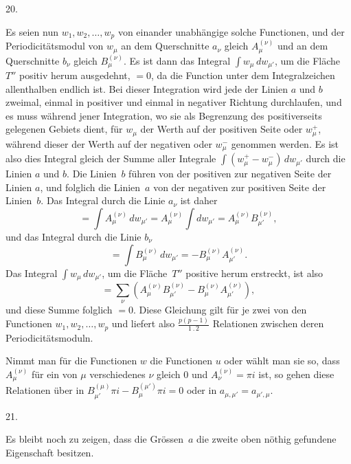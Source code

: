 \documentclass[a4paper,12pt,leqno]{article}
\begin{document}
\medbreak

\centerline{20.}

\nobreak\medskip

Es seien nun $w_1, w_2,\ldots, w_p$ von einander unabh\"{a}ngige
solche Functionen, und der Periodicit\"{a}tsmodul von $w_\mu$ an
dem Querschnitte $a_\nu$ gleich $A_\mu^{(\nu)}$ und an dem
Querschnitte $b_\nu$ gleich $B_{\mu}^{(\nu)}$.  Es ist dann das
Integral $\int w_\mu \, dw_{\mu'}$, um die Fl\"{a}che~$T''$
positiv herum ausgedehnt, $= 0$, da die Function unter dem
Integralzeichen allenthalben endlich ist.  Bei dieser Integration
wird jede der Linien $a$ und $b$ zweimal, einmal in positiver und
einmal in negativer Richtung durchlaufen, und es muss w\"{a}hrend
jener Integration, wo sie als Begrenzung des positiverseits
gelegenen Gebiets dient, f\"{u}r $w_\mu$ der Werth auf der
positiven Seite oder $w_\mu^+$, w\"{a}hrend dieser der Werth auf
der negativen oder $w_\mu^-$ genommen werden.  Es ist also dies
Integral gleich der Summe aller Integrale
$\int (w_\mu^+ - w_\mu^-) \, dw_{\mu'}$
durch die Linien $a$ und $b$.  Die Linien~$b$ f\"{u}hren von der
positiven zur negativen Seite der Linien $a$, und folglich die
Linien~$a$ von der negativen zur positiven Seite der Linien~$b$.
Das Integral durch die Linie $a_\nu$ ist daher
\[ = \int A_\mu^{(\nu)} \, dw_{\mu'}
   = A_\mu^{(\nu)} \int dw_{\mu'}
   = A_\mu^{(\nu)} B_{\mu'}^{(\nu)},\]
und das Integral durch die Linie $b_\nu$
\[ = \int B_\mu^{(\nu)} \, dw_{\mu'}
   = - B_\mu^{(\nu)} A_{\mu'}^{(\nu)}.\]
Das Integral $\int w_\mu \, dw_{\mu'}$, um die Fl\"{a}che~$T''$
positive herum erstreckt, ist also
\[ = \sum_\nu ( A_\mu^{(\nu)} B_{\mu'}^{(\nu)}
      - B_\mu^{(\nu)} A_{\mu'}^{(\nu)} ),\]
und diese Summe folglich $= 0$.  Diese Gleichung gilt f\"{u}r je
zwei von den Functionen $w_1, w_2,\ldots, w_p$ und liefert also
$\displaystyle \frac{p(p - 1)}{1 \mathbin{.} 2}$
Relationen zwischen deren Periodicit\"{a}tsmoduln.

Nimmt man f\"{u}r die Functionen $w$ die Functionen $u$ oder
w\"{a}hlt man sie so, dass $A_\mu^{(\nu)}$ f\"{u}r ein von $\mu$
verschiedenes $\nu$ gleich $0$ und $A_\nu^{(\nu)} = \pi i$ ist,
so gehen diese Relationen \"{u}ber in
$B_{\mu'}^{(\mu)} \pi i - B_\mu^{(\mu')} \pi i = 0$
oder in $a_{\mu, \mu'} = a_{\mu', \mu}$.

\medbreak

\centerline{21.}

\nobreak\medskip

Es bleibt noch zu zeigen, dass die Gr\"{o}ssen~$a$ die zweite
oben n\"{o}thig gefundene Eigenschaft besitzen.
\end{document}

